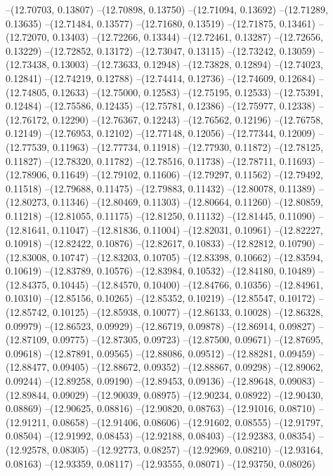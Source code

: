 --(12.70703, 0.13807)
--(12.70898, 0.13750)
--(12.71094, 0.13692)
--(12.71289, 0.13635)
--(12.71484, 0.13577)
--(12.71680, 0.13519)
--(12.71875, 0.13461)
--(12.72070, 0.13403)
--(12.72266, 0.13344)
--(12.72461, 0.13287)
--(12.72656, 0.13229)
--(12.72852, 0.13172)
--(12.73047, 0.13115)
--(12.73242, 0.13059)
--(12.73438, 0.13003)
--(12.73633, 0.12948)
--(12.73828, 0.12894)
--(12.74023, 0.12841)
--(12.74219, 0.12788)
--(12.74414, 0.12736)
--(12.74609, 0.12684)
--(12.74805, 0.12633)
--(12.75000, 0.12583)
--(12.75195, 0.12533)
--(12.75391, 0.12484)
--(12.75586, 0.12435)
--(12.75781, 0.12386)
--(12.75977, 0.12338)
--(12.76172, 0.12290)
--(12.76367, 0.12243)
--(12.76562, 0.12196)
--(12.76758, 0.12149)
--(12.76953, 0.12102)
--(12.77148, 0.12056)
--(12.77344, 0.12009)
--(12.77539, 0.11963)
--(12.77734, 0.11918)
--(12.77930, 0.11872)
--(12.78125, 0.11827)
--(12.78320, 0.11782)
--(12.78516, 0.11738)
--(12.78711, 0.11693)
--(12.78906, 0.11649)
--(12.79102, 0.11606)
--(12.79297, 0.11562)
--(12.79492, 0.11518)
--(12.79688, 0.11475)
--(12.79883, 0.11432)
--(12.80078, 0.11389)
--(12.80273, 0.11346)
--(12.80469, 0.11303)
--(12.80664, 0.11260)
--(12.80859, 0.11218)
--(12.81055, 0.11175)
--(12.81250, 0.11132)
--(12.81445, 0.11090)
--(12.81641, 0.11047)
--(12.81836, 0.11004)
--(12.82031, 0.10961)
--(12.82227, 0.10918)
--(12.82422, 0.10876)
--(12.82617, 0.10833)
--(12.82812, 0.10790)
--(12.83008, 0.10747)
--(12.83203, 0.10705)
--(12.83398, 0.10662)
--(12.83594, 0.10619)
--(12.83789, 0.10576)
--(12.83984, 0.10532)
--(12.84180, 0.10489)
--(12.84375, 0.10445)
--(12.84570, 0.10400)
--(12.84766, 0.10356)
--(12.84961, 0.10310)
--(12.85156, 0.10265)
--(12.85352, 0.10219)
--(12.85547, 0.10172)
--(12.85742, 0.10125)
--(12.85938, 0.10077)
--(12.86133, 0.10028)
--(12.86328, 0.09979)
--(12.86523, 0.09929)
--(12.86719, 0.09878)
--(12.86914, 0.09827)
--(12.87109, 0.09775)
--(12.87305, 0.09723)
--(12.87500, 0.09671)
--(12.87695, 0.09618)
--(12.87891, 0.09565)
--(12.88086, 0.09512)
--(12.88281, 0.09459)
--(12.88477, 0.09405)
--(12.88672, 0.09352)
--(12.88867, 0.09298)
--(12.89062, 0.09244)
--(12.89258, 0.09190)
--(12.89453, 0.09136)
--(12.89648, 0.09083)
--(12.89844, 0.09029)
--(12.90039, 0.08975)
--(12.90234, 0.08922)
--(12.90430, 0.08869)
--(12.90625, 0.08816)
--(12.90820, 0.08763)
--(12.91016, 0.08710)
--(12.91211, 0.08658)
--(12.91406, 0.08606)
--(12.91602, 0.08555)
--(12.91797, 0.08504)
--(12.91992, 0.08453)
--(12.92188, 0.08403)
--(12.92383, 0.08354)
--(12.92578, 0.08305)
--(12.92773, 0.08257)
--(12.92969, 0.08210)
--(12.93164, 0.08163)
--(12.93359, 0.08117)
--(12.93555, 0.08071)
--(12.93750, 0.08026)
